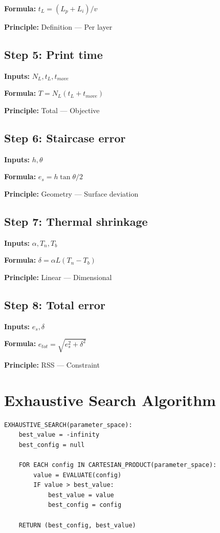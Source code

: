\documentclass[11pt,twocolumn]{article}
\begin{document}
\textbf{Formula:} $t_L = (L_p + L_i)/v$

\textbf{Principle:} Definition --- Per layer

\subsection*{Step 5: Print time}
\textbf{Inputs:} $N_L, t_L, t_{move}$

\textbf{Formula:} $T = N_L(t_L + t_{move})$

\textbf{Principle:} Total --- Objective

\subsection*{Step 6: Staircase error}
\textbf{Inputs:} $h, \theta$

\textbf{Formula:} $e_s = h \tan\theta / 2$

\textbf{Principle:} Geometry --- Surface deviation

\subsection*{Step 7: Thermal shrinkage}
\textbf{Inputs:} $\alpha, T_n, T_b$

\textbf{Formula:} $\delta = \alpha L (T_n - T_b)$

\textbf{Principle:} Linear --- Dimensional

\subsection*{Step 8: Total error}
\textbf{Inputs:} $e_s, \delta$

\textbf{Formula:} $e_{tot} = \sqrt{e_s^2 + \delta^2}$

\textbf{Principle:} RSS --- Constraint


\section{Exhaustive Search Algorithm}

\begin{verbatim}
EXHAUSTIVE_SEARCH(parameter_space):
    best_value = -infinity
    best_config = null
    
    FOR EACH config IN CARTESIAN_PRODUCT(parameter_space):
        value = EVALUATE(config)
        IF value > best_value:
            best_value = value
            best_config = config
    
    RETURN (best_config, best_value)
\end{verbatim}
\end{document}
